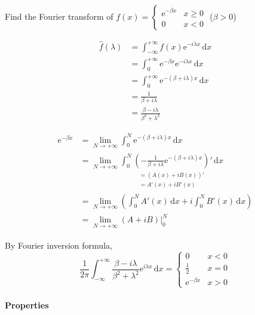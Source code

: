 \begin{example}
    Find the Fourier transform of $f(x)=\begin{cases}
            \mathrm{e}^{-\beta x} & x\geq 0 \\
            0                     & x<0
        \end{cases}$ ($\beta>0$)

    \begin{align*}
        \hat{f}(\lambda)
         & =\int_{-\infty}^{+\infty}f(x)\mathrm{e}^{-i\lambda x}\,\mathrm{d}x          \\
         & =\int_0^{+\infty}\mathrm{e}^{-\beta x}\mathrm{e}^{-i\lambda x}\,\mathrm{d}x \\
         & =\int_0^{+\infty}\mathrm{e}^{-(\beta+i\lambda)x}\,\mathrm{d}x               \\
         & =\frac{1}{\beta+i\lambda}                                                   \\
         & =\frac{\beta-i\lambda}{\beta^2+\lambda^2}
    \end{align*}

    \begin{align*}
        \mathrm{e}^{-\beta x}
         & =\lim_{N\to+\infty}\int_0^N\mathrm{e}^{-(\beta+i\lambda)x}\,\mathrm{d}x                \\
         & =\lim_{N\to+\infty}\int_0^N\underset{\substack{=(A(x)+iB(x))'                          \\=A'(x)+iB'(x)}}{\left(-\frac{1}{\beta+i\lambda}\mathrm{e}^{-(\beta+i\lambda)x}\right)}'\,\mathrm{d}x\\
         & =\lim_{N\to+\infty}\left(\int_0^NA'(x)\,\mathrm{d}x+i\int_0^NB'(x)\,\mathrm{d}x\right) \\
         & =\lim_{N\to+\infty}\left.\left(A+iB\right)\right|_0^N
    \end{align*}

    By Fourier inversion formula,
    $$\frac{1}{2\pi}\int_{-\infty}^{+\infty}\frac{\beta-i\lambda}{\beta^2+\lambda^2}\mathrm{e}^{i\lambda x}\,\mathrm{d}x=\begin{cases}
            0                     & x<0 \\
            \frac{1}{2}           & x=0 \\
            \mathrm{e}^{-\beta x} & x>0
        \end{cases}$$
\end{example}

\paragraph*{Properties}

